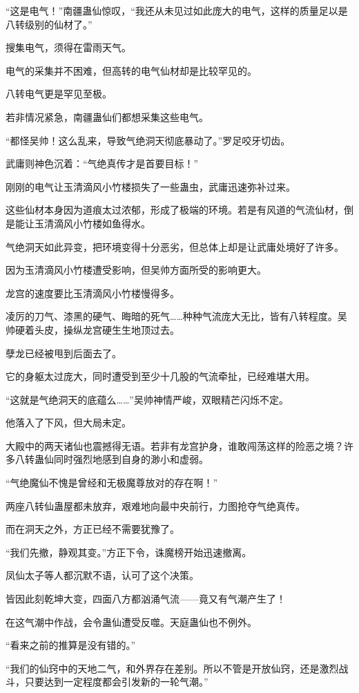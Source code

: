 \begin{this_body}
“这是电气！”南疆蛊仙惊叹，“我还从未见过如此庞大的电气，这样的质量足以是八转级别的仙材了。”

搜集电气，须得在雷雨天气。

电气的采集并不困难，但高转的电气仙材却是比较罕见的。

八转电气更是罕见至极。

若非情况紧急，南疆蛊仙们都想采集这些电气。

“都怪吴帅！这么乱来，导致气绝洞天彻底暴动了。”罗足咬牙切齿。

武庸则神色沉着：“气绝真传才是首要目标！”

刚刚的电气让玉清滴风小竹楼损失了一些蛊虫，武庸迅速弥补过来。

这些仙材本身因为道痕太过浓郁，形成了极端的环境。若是有风道的气流仙材，倒是能让玉清滴风小竹楼如鱼得水。

气绝洞天如此异变，把环境变得十分恶劣，但总体上却是让武庸处境好了许多。

因为玉清滴风小竹楼遭受影响，但吴帅方面所受的影响更大。

龙宫的速度要比玉清滴风小竹楼慢得多。

凌厉的刀气、漆黑的硬气、晦暗的死气……种种气流庞大无比，皆有八转程度。吴帅硬着头皮，操纵龙宫硬生生地顶过去。

孽龙已经被甩到后面去了。

它的身躯太过庞大，同时遭受到至少十几股的气流牵扯，已经难堪大用。

“这就是气绝洞天的底蕴么……”吴帅神情严峻，双眼精芒闪烁不定。

他落入了下风，但大局未定。

大殿中的两天诸仙也震撼得无语。若非有龙宫护身，谁敢闯荡这样的险恶之境？许多八转蛊仙同时强烈地感到自身的渺小和虚弱。

“气绝魔仙不愧是曾经和无极魔尊放对的存在啊！”

两座八转仙蛊屋都未放弃，艰难地向最中央前行，力图抢夺气绝真传。

而在洞天之外，方正已经不需要犹豫了。

“我们先撤，静观其变。”方正下令，诛魔榜开始迅速撤离。

凤仙太子等人都沉默不语，认可了这个决策。

皆因此刻乾坤大变，四面八方都汹涌气流——竟又有气潮产生了！

在这气潮中作战，会令蛊仙遭受反噬。天庭蛊仙也不例外。

“看来之前的推算是没有错的。”

“我们的仙窍中的天地二气，和外界存在差别。所以不管是开放仙窍，还是激烈战斗，只要达到一定程度都会引发新的一轮气潮。”


\end{this_body}
